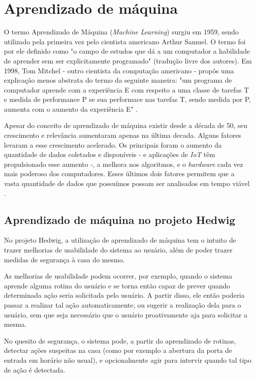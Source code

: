 \chapter{Aprendizado de máquina}

	O termo Aprendizado de Máquina (\emph{Machine Learning}) surgiu em 1959, sendo utilizado pela primeira vez  pelo cientista americano Arthur Samuel. O termo foi por ele definido como "o campo de estudos que dá a um computador a habilidade de aprender sem ser explicitamente programado" (tradução livre dos autores). Em 1998, Tom Mitchel - outro cientista da computação americano - propôs uma explicação menos abstrata do termo da seguinte maneira: "um programa de computador aprende com a experiência E com respeito a uma classe de tarefas T e medida de performance P se sua performace nas tarefas T, sendo medida por P, aumenta com o aumento da experiência E" \cite{Coursera}.

	Apesar do conceito de aprendizado de máquina existir desde a década de 50, seu crescimento e relevância aumentaram apenas na última decada. Alguns fatores levaram a esse crescimento acelerado. Os principais foram o aumento da quantidade de dados coletados e disponíveis - e aplicações de \emph{IoT} têm propulsionado esse aumento -, a melhora nos algoritmos, e o \emph{hardware} cada vez mais poderoso dos computadores. Esses últimos dois fatores permitem que a vasta quantidade de dados que possuímos possam ser analisados em tempo viável \cite{hbrMlExplosion}.

	\section{Aprendizado de máquina no projeto Hedwig}

		No projeto Hedwig, a utilização de aprendizado de máquina tem o intuito de trazer melhorias de usabilidade do sistema ao usuário, além de poder trazer medidas de segurança à casa do mesmo.

		As melhorias de usabilidade podem ocorrer, por exemplo, quando o sistema aprende alguma rotina do usuário e se torna então capaz de prever quando determinada ação seria solicitada pelo usuário. A partir disso, ele então poderia passar a realizar tal ação automaticamente, ou sugerir a realização dela para o usuário, sem que seja necessário que o usuário proativamente aja para solicitar a mesma.

		No quesito de segurança, o sistema pode, a partir do aprendizado de rotinas, detectar ações suspeitas na casa (como por exemplo a abertura da porta de entrada em horário não usual), e opcionalmente agir para intervir quando tal tipo de ação é detectada.

